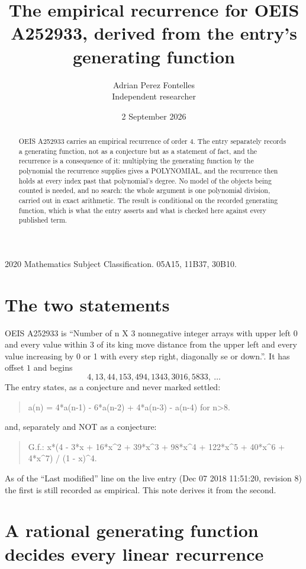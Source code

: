 \documentclass[11pt,a4paper]{article}
\title{The empirical recurrence for OEIS A252933, derived from the entry's generating function}
\author{Adrian Perez Fontelles\\ \small Independent researcher}
\date{2 September 2026}
\theoremstyle{plain}
\theoremstyle{definition}
\begin{document}
\maketitle

\begin{abstract}
OEIS A252933 carries an empirical recurrence of order $4$. The entry separately records a
generating function, not as a conjecture but as a statement of fact, and the recurrence is a
consequence of it: multiplying the generating function by the polynomial the recurrence
supplies gives a POLYNOMIAL, and the recurrence then holds at every index past that
polynomial's degree. No model of the objects being counted is needed, and no search: the
whole argument is one polynomial division, carried out in exact arithmetic. The result is
conditional on the recorded generating function, which is what the entry asserts and what is
checked here against every published term.
\end{abstract}

\noindent\small 2020 Mathematics Subject Classification. 05A15, 11B37, 30B10.\normalsize

\section{The two statements}

OEIS A252933 is ``Number of n X 3 nonnegative integer arrays with upper left 0 and every value within 3 of its king move distance from the upper left and every value increasing by 0 or 1 with every step right, diagonally se or down.''. It has offset $1$ and begins
\[
4, 13, 44, 153, 494, 1343, 3016, 5833,\ \dots
\]
The entry states, as a conjecture and never marked settled:
\begin{quote}
a(n) = 4*a(n-1) - 6*a(n-2) + 4*a(n-3) - a(n-4) for n>8.
\end{quote}
and, separately and NOT as a conjecture:
\begin{quote}
G.f.: x*(4 - 3*x + 16*x\^{}2 + 39*x\^{}3 + 98*x\^{}4 + 122*x\^{}5 + 40*x\^{}6 + 4*x\^{}7) / (1 - x)\^{}4.
\end{quote}
As of the ``Last modified'' line on the live entry (Dec 07 2018 11:51:20, revision 8) the first is still
recorded as empirical. This note derives it from the second.

\section{A rational generating function decides every linear recurrence}
\end{document}
